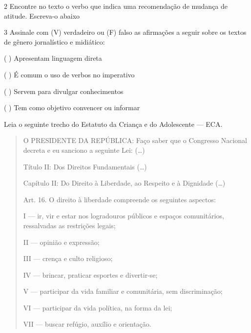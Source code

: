 
\num{2} Encontre no texto o verbo que indica uma recomendação de mudança de atitude.
Escreva-o abaixo


\num{3} Assinale com (V) verdadeiro ou (F) falso as afirmações a seguir sobre os textos
de gênero jornalístico e midiático:

\begin{itemize}

( ) Apresentam linguagem direta

( ) É comum o uso de verbos no imperativo

( ) Servem para divulgar conhecimentos

( ) Tem como objetivo convencer ou informar

\end{itemize}


Leia o seguinte trecho do Estatuto da Criança e do Adolescente --- ECA.

\begin{quote}
O PRESIDENTE DA REPÚBLICA: Faço saber que o Congresso Nacional decreta e
eu sanciono a seguinte Lei: (\ldots{})

Título II: Dos Direitos Fundamentais (\ldots{})

Capítulo II: Do Direito à Liberdade, ao Respeito e à Dignidade (\ldots{})

Art. 16. O direito à liberdade compreende os seguintes aspectos:

I --- ir, vir e estar nos logradouros públicos e espaços comunitários,
ressalvadas as restrições legais;

II --- opinião e expressão;

III --- crença e culto religioso;

IV --- brincar, praticar esportes e divertir-se;

V --- participar da vida familiar e comunitária, sem discriminação;

VI --- participar da vida política, na forma da lei;

VII --- buscar refúgio, auxílio e orientação. \\

\end{quote}

